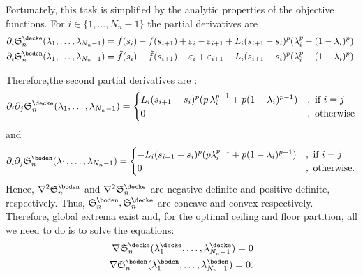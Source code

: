  
Fortunately, this task is simplified by the analytic properties of the objective functions.
For $i \in \{1,\ldots,{N_n}-1\}$ the partial derivatives are 
\begin{align*}
\partial_i \mathfrak S^\decke_n (\lambda_1,\ldots,\lambda_{{N_n}-1}) &= \tilde f(s_i) - \tilde f(s_{i+1})  + \varepsilon_i - \varepsilon_{i+1} 
+ L_i   (s_{i+1}-s_i )^p   (\lambda_i^p- (1-\lambda_i )^p)\\
\partial_i \mathfrak S^\boden_n (\lambda_1,\ldots,\lambda_{{N_n}-1}) &= \tilde f(s_i)  - \tilde f(s_{i+1}) - \varepsilon_i + \varepsilon_{i+1} - L_i   (s_{i+1}-s_i )^p   (\lambda_i^p- (1-\lambda_i )^p).
\end{align*}

Therefore,the second partial derivatives are :
\[
\partial_i \partial_j \mathfrak S^\decke_n (\lambda_1,\ldots,\lambda_{{N_n}-1}) = \begin{cases}  L_i   (s_{i+1}-s_i )^p   (p \, \lambda_i^{p-1}+ p (1-\lambda_i )^{p-1})&, \text{ if } i =j\\ 0 &, \text{ otherwise} \end{cases}
\]
and 
\[
\partial_i \partial_j \mathfrak S^\boden_n (\lambda_1,\ldots,\lambda_{{N_n}-1})= \begin{cases}  - L_i   (s_{i+1}-s_i )^p   (p \lambda_i^{p-1}+ p (1-\lambda_i )^{p-1}) &,  \text{ if }  i =j\\ 0 &, \text{ otherwise.} \end{cases}
\]
Hence, $\nabla^2 \mathfrak S^\boden_n $ and $\nabla^2 \mathfrak S^\decke_n$ are negative definite and positive definite, respectively. Thus, $\mathfrak S^\boden_n, \mathfrak S^\decke_n$ are concave and convex respectively.  Therefore, global extrema exist and, for the optimal ceiling and floor partition, all we need to do is to solve the equations: 
\begin{align}
\nabla \mathfrak S^\decke_n (\lambda_1^\decke,\ldots, \lambda_{N_u-1}^\decke) = 0\\
\nabla \mathfrak S^\boden_n (\lambda_1^\boden,\ldots, \lambda_{N_u-1}^\boden) = 0.
\end{align}





